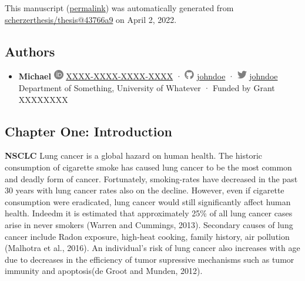 This manuscript
(\href{https://scherzerthesis.github.io/thesis/v/43766a9c6b43fa547b7d571ee8496e8e2f89912f/}{permalink})
was automatically generated
from \href{https://github.com/scherzerthesis/thesis/tree/43766a9c6b43fa547b7d571ee8496e8e2f89912f}{scherzerthesis/thesis@43766a9}
on April 2, 2022.

\hypertarget{authors}{%
\subsection{Authors}\label{authors}}

\begin{itemize}
\tightlist
\item
  \textbf{Michael}
  \includegraphics[width=0.16667in,height=0.16667in]{images/orcid.svg}
  \href{https://orcid.org/XXXX-XXXX-XXXX-XXXX}{XXXX-XXXX-XXXX-XXXX}
  · \includegraphics[width=0.16667in,height=0.16667in]{images/github.svg}
  \href{https://github.com/johndoe}{johndoe}
  · \includegraphics[width=0.16667in,height=0.16667in]{images/twitter.svg}
  \href{https://twitter.com/johndoe}{johndoe}
  Department of Something, University of Whatever
  · Funded by Grant XXXXXXXX
\end{itemize}

\hypertarget{chapter-one-introduction}{%
\subsection{Chapter One: Introduction}\label{chapter-one-introduction}}

\textbf{NSCLC} Lung cancer is a global hazard on human health. The historic consumption of cigarette smoke has caused lung cancer to be the most common and deadly form of cancer. Fortunately, smoking-rates have decreased in the past 30 years with lung cancer rates also on the decline. However, even if cigarette consumption were eradicated, lung cancer would still significantly affect human health. Indeedm it is estimated that approximately 25\% of all lung cancer cases arise in never smokers (Warren and Cummings, 2013). Secondary causes of lung cancer include Radon exposure, high-heat cooking, family history, air pollution (Malhotra et al., 2016). An individual's risk of lung cancer also increases with age due to decreases in the efficiency of tumor supressive mechanisms such as tumor immunity and apoptosis(de Groot and Munden, 2012).

